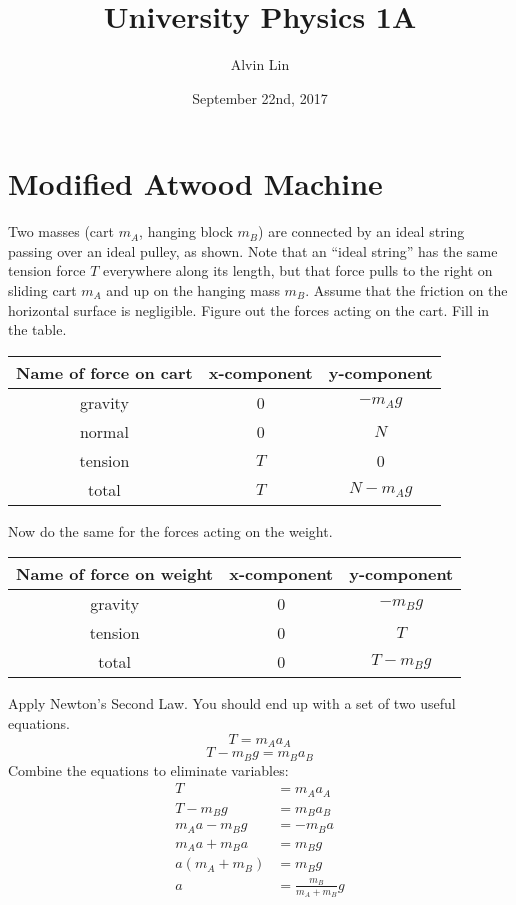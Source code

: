 \documentclass[letterpaper, 12pt]{math}
\title{University Physics 1A}
\author{Alvin Lin}
\date{September 22nd, 2017}
\begin{document}
\maketitle

\section*{Modified Atwood Machine}
Two masses (cart \( m_A \), hanging block \( m_B \)) are connected by an ideal
string passing over an ideal pulley, as shown. Note that an ``ideal string'' has
the same tension force \( T \) everywhere along its length, but that force pulls
to the right on sliding cart \( m_A \) and up on the hanging mass \( m_B \).
Assume that the friction on the horizontal surface is negligible. Figure
out the forces acting on the cart. Fill in the table.
\begin{center}
  \begin{tabular}{|c|c|c|}
    \hline
    \textbf{Name of force on cart} & \textbf{x-component} &
      \textbf{y-component} \\ \hline
    gravity & 0 & \( -m_Ag \) \\ \hline
    normal & 0 & \( N \) \\ \hline
    tension & \( T \) & 0 \\ \hline
    total & \( T \) & \( N-m_Ag \) \\ \hline
  \end{tabular}
\end{center}
Now do the same for the forces acting on the weight.
\begin{center}
  \begin{tabular}{|c|c|c|}
    \hline
    \textbf{Name of force on weight} & \textbf{x-component} &
      \textbf{y-component} \\ \hline
    gravity & 0 & \( -m_Bg \) \\ \hline
    tension & 0 & \( T \) \\ \hline
    total & 0 & \( T-m_Bg \) \\ \hline
  \end{tabular}
\end{center}
Apply Newton's Second Law. You should end up with a set of two useful
equations.
\[ T = m_Aa_A \]
\[ T-m_Bg = m_Ba_B \]
Combine the equations to eliminate variables:
\begin{align*}
  T &= m_Aa_A \\
  T-m_Bg &= m_Ba_B \\
  m_Aa-m_Bg &= -m_Ba \\
  m_Aa+m_Ba &= m_Bg \\
  a(m_A+m_B) &= m_Bg \\
  a &= \frac{m_B}{m_A+m_B}g
\end{align*}
\end{document}
